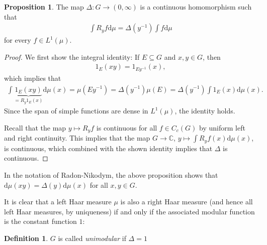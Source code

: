 \documentclass[10pt,twoside,openany,final]{memoir}
\theoremstyle{definition}
\newtheorem{proposition}[theorem]{Proposition}
\newtheorem{definition}[theorem]{Definition}
\theoremstyle{Break}
\newcommand{\C}{\mathbb{C}}
\renewcommand{\d}{\mathrm{d}}
\begin{document}
\begin{proposition}
The map $\Delta \colon G \to (0,\infty)$ is a continuous homomorphism such that	
\begin{align*}
	\int R_y f \d \mu = \Delta(y^{-1}) \int f \d \mu
\end{align*}
for every $f \in L^1(\mu)$.
\end{proposition}
\begin{proof}
	We first show the integral identity: If $E \subseteq G$ and $x,y \in G$, then
\begin{align*}
	1_{E}(xy)=1_{Ey^{-1}}(x),
\end{align*}
which implies that 
\begin{align*}
	\int \underbrace{1_{E}(xy)}_{=R_y 1_{E}(x)} \d \mu(x) = \mu(Ey^{-1})=\Delta(y^{-1})\mu(E)=\Delta(y^{-1}) \int 1_{E}(x) \d \mu(x).
\end{align*}
Since the span of simple functions are dense in $L^1(\mu)$, the identity holds.

Recall that the map $y \mapsto R_y f$ is continuous for all $f \in C_c(G)$ by uniform left and right continuity. This implies that the map $G \to \C$, $y \mapsto \int R_y f(x) \d \mu(x)$, is continuous, which combined with the shown identity implies that $\Delta$ is continuous.
\end{proof}
In the notation of Radon-Nikodym, the above proposition shows that $\d \mu(xy)=\Delta(y) \d \mu(x)$ for all $x,y \in G$.

It is clear that a left Haar measure $\mu$ is also a right Haar measure (and hence all left Haar measures, by uniqueness) if and only if the associated modular function is the constant function $1$:
\begin{definition}
	$G$ is called \emph{unimodular} if $\Delta=1$	
\end{definition}
\end{document}
